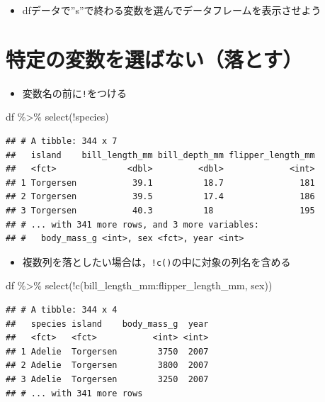 \documentclass[
  xelatex,ja=standard, b5paper]{bxjsbook}
\newenvironment{Shaded}{\begin{snugshade}}{\end{snugshade}}
\newcommand{\FunctionTok}[1]{\textcolor[rgb]{0.00,0.00,0.00}{#1}}
\newcommand{\NormalTok}[1]{#1}
\newcommand{\SpecialCharTok}[1]{\textcolor[rgb]{0.00,0.00,0.00}{#1}}
\providecommand{\tightlist}{%
  \setlength{\itemsep}{0pt}\setlength{\parskip}{0pt}}
\begin{document}
\begin{itemize}
\tightlist
\item
  dfデータで''s''で終わる変数を選んでデータフレームを表示させよう
\end{itemize}

\hypertarget{select-drop}{%
\section{特定の変数を選ばない（落とす）}\label{select-drop}}

\begin{itemize}
\tightlist
\item
  変数名の前に\texttt{!}をつける
\end{itemize}

\begin{Shaded}
\begin{Highlighting}[]
\NormalTok{df }\SpecialCharTok{\%\textgreater{}\%} 
  \FunctionTok{select}\NormalTok{(}\SpecialCharTok{!}\NormalTok{species)}
\end{Highlighting}
\end{Shaded}

\begin{verbatim}
## # A tibble: 344 x 7
##   island    bill_length_mm bill_depth_mm flipper_length_mm
##   <fct>              <dbl>         <dbl>             <int>
## 1 Torgersen           39.1          18.7               181
## 2 Torgersen           39.5          17.4               186
## 3 Torgersen           40.3          18                 195
## # ... with 341 more rows, and 3 more variables:
## #   body_mass_g <int>, sex <fct>, year <int>
\end{verbatim}

\begin{itemize}
\tightlist
\item
  複数列を落としたい場合は，\texttt{!c()}の中に対象の列名を含める
\end{itemize}

\begin{Shaded}
\begin{Highlighting}[]
\NormalTok{df }\SpecialCharTok{\%\textgreater{}\%} 
  \FunctionTok{select}\NormalTok{(}\SpecialCharTok{!}\FunctionTok{c}\NormalTok{(bill\_length\_mm}\SpecialCharTok{:}\NormalTok{flipper\_length\_mm, sex))}
\end{Highlighting}
\end{Shaded}

\begin{verbatim}
## # A tibble: 344 x 4
##   species island    body_mass_g  year
##   <fct>   <fct>           <int> <int>
## 1 Adelie  Torgersen        3750  2007
## 2 Adelie  Torgersen        3800  2007
## 3 Adelie  Torgersen        3250  2007
## # ... with 341 more rows
\end{verbatim}
\end{document}
